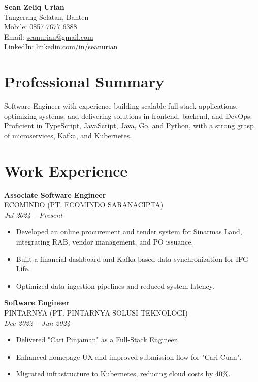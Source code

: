 \documentclass[11pt,a4paper]{article}
\begin{document}
\begin{center}
    \textbf{\Large Sean Zeliq Urian} \\
    Tangerang Selatan, Banten \\
    Mobile: 0857 7677 6388 \\
    Email: \href{mailto:seanurian@gmail.com}{seanurian@gmail.com} \\
    LinkedIn: \href{https://linkedin.com/in/seanurian}{linkedin.com/in/seanurian} \\
\end{center}

\vspace{0.5cm}

\section*{Professional Summary}
Software Engineer with experience building scalable full-stack applications, optimizing systems, and delivering solutions in frontend, backend, and DevOps. Proficient in TypeScript, JavaScript, Java, Go, and Python, with a strong grasp of microservices, Kafka, and Kubernetes.

\section*{Work Experience}

\textbf{Associate Software Engineer} \\
ECOMINDO (PT. ECOMINDO SARANACIPTA) \\
\textit{Jul 2024 -- Present}
\begin{itemize}[leftmargin=*]
    \item Developed an online procurement and tender system for Sinarmas Land, integrating RAB, vendor management, and PO issuance.
    \item Built a financial dashboard and Kafka-based data synchronization for IFG Life.
    \item Optimized data ingestion pipelines and reduced system latency.
\end{itemize}

\textbf{Software Engineer} \\
PINTARNYA (PT. PINTARNYA SOLUSI TEKNOLOGI) \\
\textit{Dec 2022 -- Jun 2024}
\begin{itemize}[leftmargin=*]
    \item Delivered "Cari Pinjaman" as a Full-Stack Engineer.
    \item Enhanced homepage UX and improved submission flow for "Cari Cuan".
    \item Migrated infrastructure to Kubernetes, reducing cloud costs by 40\%.
\end{itemize}
\end{document}
